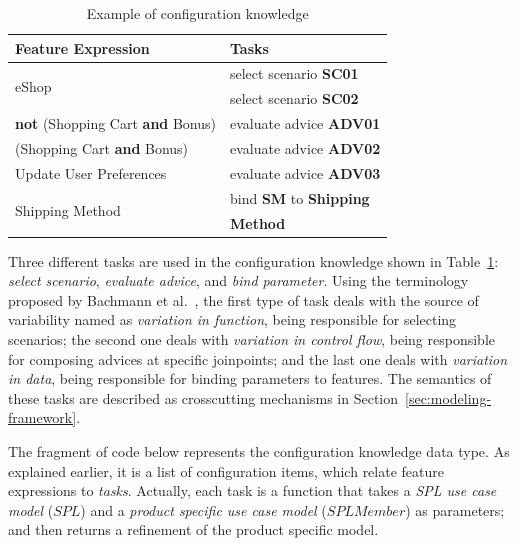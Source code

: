 \documentclass{acm_proc_article-sp}
\begin{document}
\begin{table}[htb]
\begin{small}
\begin{tabular}{|lp{1.4in}|}
\hline
Feature Expression  						& Tasks					 \\ \hline \hline

\multirow{2}{*}{eShop}						& select scenario {\bf SC01} \\
											& select scenario {\bf SC02} \\	 \hline
{\bf not} (Shopping Cart {\bf and} Bonus) 	& evaluate advice {\bf ADV01} \\ \hline 
(Shopping Cart {\bf and} Bonus) 		& evaluate advice {\bf ADV02} 	\\   \hline
Update User Preferences 				& evaluate advice {\bf ADV03} \\     \hline 
\multirow{2}{*}{Shipping Method}		& bind {\bf SM} to {\bf Shipping} \\  
										& {\bf Method}\\ \hline
								
\end{tabular}
\end{small}
\caption{Example of configuration knowledge}
\label{tab:eshop-ck}
\end{table}

{\color{red}Three different tasks are used in the configuration knowledge shown
in Table~\ref{tab:eshop-ck}: \emph{select scenario}, \emph{evaluate advice}, and
\emph{bind parameter}. Using the terminology proposed by Bachmann et
al.~\cite{Bachmann:2001aa}, the first type of task deals with the source of
variability named as \emph{variation in function}, being responsible for
selecting scenarios; the second one deals with \emph{variation in control flow},
being responsible for composing advices at specific joinpoints; and the last one
deals with \emph{variation in data}, being responsible for binding parameters to
features. The semantics of these tasks are described as crosscutting mechanisms
in Section~\ref{sec:modeling-framework}.}

{\color{red} The fragment of code below represents the configuration knowledge
data type. As explained earlier, it is a list of configuration items, which
relate feature expressions to \emph{tasks}. Actually, each task is a function
that takes a \emph{SPL use case model} ($SPL$) and a \emph{product specific use
case model} ($SPLMember$) as parameters; and then returns a refinement of the
product specific model.}
 
\end{document}
